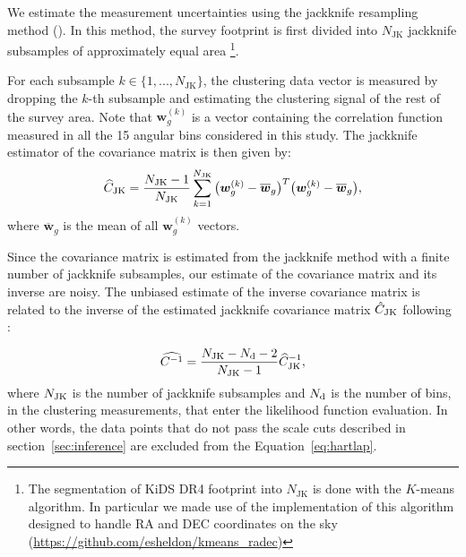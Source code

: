 \documentclass[fleqn,usenatbib,useAMS]{mnras}
\newcommand{\be}{\begin{equation}}
\newcommand{\ee}{\end{equation}}
\newcommand{\dk}{\boldsymbol{w}_{g}^{(k)}}
\newcommand{\dbar}{\overline{\boldsymbol{w}}_{g}}
\newcommand{\njk}{N_{\rm JK}}
\begin{document}
We estimate the measurement uncertainties using the jackknife resampling method (\citealt{norberg2009,oliver2016,singh2017,shirasaki2017}). 
In this method, the survey footprint is first divided into $N_{\mathrm{JK}}$ jackknife subsamples of approximately equal area \footnote{The segmentation of KiDS DR4 footprint into $N_{\mathrm{JK}}$ is done with the $K$-means algorithm. In particular we made use of the implementation of this algorithm designed to handle RA and DEC coordinates on the sky (\hyperlink{kmeans\_radec}{https://github.com/esheldon/kmeans\_radec})}.

For each subsample $k\in\{1,...,N_{\mathrm{JK}}\}$, the clustering data vector  
is measured by dropping the $k$-th subsample and estimating the clustering signal of the rest of the survey area. Note that $\boldsymbol{w}_{g}^{(k)}$ is a vector containing the correlation function measured in all the 15 angular bins considered in this study. The jackknife estimator of the covariance matrix is then given by:
\be 
\widehat{C}_{\rm JK} = \frac{\njk - 1}{\njk}\sum_{k=1}^{\njk}\big(\dk-\dbar\big)^{T}\big(\dk-\dbar\big), 
\label{eq:jk}
\ee
where $\dbar$ is the mean of all $\boldsymbol{w}_{g}^{(k)}$ vectors. 


Since the covariance matrix is estimated from the jackknife method with a finite number of jackknife subsamples, our estimate of the covariance matrix and its inverse are noisy. The unbiased estimate of the inverse covariance matrix is related to the inverse of the estimated jackknife covariance matrix $\hat{C}_{\rm JK}$ following \citet{hartlap2007}:

\be
\widehat{C^{-1}} = \frac{\njk - N_{\rm d} - 2}{\njk - 1} \widehat{C}^{-1}_{\rm JK},
\label{eq:hartlap}
\ee
where $\njk$ is the number of jackknife subsamples and $N_{\rm d}$ is the number of bins, in the clustering measurements, that enter the likelihood function evaluation. In other words, the data points that do not pass the scale cuts described in section~\ref{sec:inference} are excluded from the Equation~\ref{eq:hartlap}.  
\end{document}
